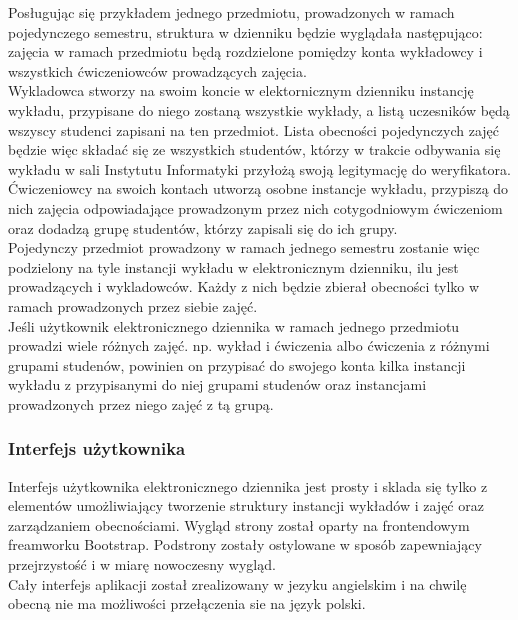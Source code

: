 \documentclass[declaration,shortabstract, mgr]{iithesis}
\begin{document}
\indent Posługując się przykładem jednego przedmiotu, prowadzonych w ramach pojedynczego semestru, struktura w dzienniku będzie wyglądała następująco: zajęcia w ramach przedmiotu będą rozdzielone pomiędzy konta wykładowcy i wszystkich ćwiczeniowców prowadzących zajęcia. \\
\indent Wykladowca stworzy na swoim koncie w elektornicznym dzienniku instancję wykładu, przypisane do niego zostaną wszystkie wykłady, a listą uczesników będą wszyscy studenci zapisani na ten przedmiot. Lista obecności pojedynczych zajęć będzie więc składać się ze wszystkich studentów, którzy w trakcie odbywania się wykładu w sali Instytutu Informatyki przyłożą swoją legitymację do weryfikatora.\\
\indent Ćwiczeniowcy na swoich kontach utworzą osobne instancje wykładu, przypiszą do nich zajęcia odpowiadające prowadzonym przez nich cotygodniowym ćwiczeniom oraz dodadzą grupę studentów, którzy zapisali się do ich grupy. \\
\indent Pojedynczy przedmiot prowadzony w ramach jednego semestru zostanie więc podzielony na tyle instancji wykładu w elektronicznym dzienniku, ilu jest prowadzących i wykladowców. Każdy z nich będzie zbierał obecności tylko w ramach prowadzonych przez siebie zajęć. \\
\indent Jeśli użytkownik elektronicznego dziennika w ramach jednego przedmiotu prowadzi wiele różnych zajęć. np. wykład i ćwiczenia albo ćwiczenia z różnymi grupami studenów, powinien on przypisać do swojego konta kilka instancji wykładu z przypisanymi do niej grupami studenów oraz instancjami prowadzonych przez niego zajęć z tą grupą.

\subsubsection{Interfejs użytkownika}
\indent Interfejs użytkownika elektronicznego dziennika jest prosty i sklada się tylko z elementów umożliwiający tworzenie struktury instancji wykładów i zajęć oraz zarządzaniem obecnościami. Wygląd strony został oparty na frontendowym freamworku Bootstrap\cite{bootstrap}. 
Podstrony zostały ostylowane w sposób zapewniający przejrzystość i w miarę nowoczesny wygląd. \\
\indent Cały interfejs aplikacji został zrealizowany w jezyku angielskim i na chwilę obecną nie ma możliwości przełączenia sie na język polski.\\
\end{document}
